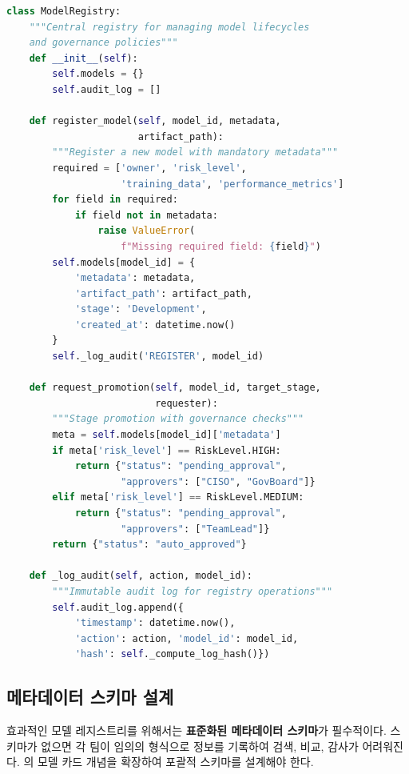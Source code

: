 \begin{lstlisting}[language=Python, caption={Integrated Model Registry and Governance Management Class}, label={lst:registry}]
class ModelRegistry:
    """Central registry for managing model lifecycles
    and governance policies"""
    def __init__(self):
        self.models = {}
        self.audit_log = []

    def register_model(self, model_id, metadata,
                       artifact_path):
        """Register a new model with mandatory metadata"""
        required = ['owner', 'risk_level',
                    'training_data', 'performance_metrics']
        for field in required:
            if field not in metadata:
                raise ValueError(
                    f"Missing required field: {field}")
        self.models[model_id] = {
            'metadata': metadata,
            'artifact_path': artifact_path,
            'stage': 'Development',
            'created_at': datetime.now()
        }
        self._log_audit('REGISTER', model_id)

    def request_promotion(self, model_id, target_stage,
                          requester):
        """Stage promotion with governance checks"""
        meta = self.models[model_id]['metadata']
        if meta['risk_level'] == RiskLevel.HIGH:
            return {"status": "pending_approval",
                    "approvers": ["CISO", "GovBoard"]}
        elif meta['risk_level'] == RiskLevel.MEDIUM:
            return {"status": "pending_approval",
                    "approvers": ["TeamLead"]}
        return {"status": "auto_approved"}

    def _log_audit(self, action, model_id):
        """Immutable audit log for registry operations"""
        self.audit_log.append({
            'timestamp': datetime.now(),
            'action': action, 'model_id': model_id,
            'hash': self._compute_log_hash()})
\end{lstlisting}

\subsection{메타데이터 스키마 설계}
\label{sec:14.1.3}

효과적인 모델 레지스트리를 위해서는 \textbf{표준화된 메타데이터 스키마}가 필수적이다. 스키마가 없으면 각 팀이 임의의 형식으로 정보를 기록하여 검색, 비교, 감사가 어려워진다. \cite{mitchell2019model}의 모델 카드 개념을 확장하여 포괄적 스키마를 설계해야 한다.

